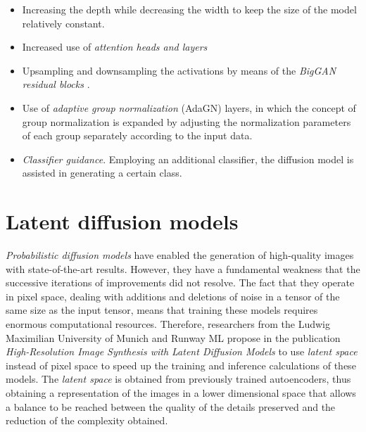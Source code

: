 \begin{itemize}
    \item Increasing the depth while decreasing the width to keep the size of the model relatively constant.
    \item Increased use of \textit{attention heads and layers}
    \item Upsampling and downsampling the activations by means of the \textit{BigGAN residual blocks} \cite{brock2018large}.
    \item Use of \textit{adaptive group normalization} (AdaGN) layers, in which the concept of group normalization is expanded by adjusting the normalization parameters of each group separately according to the input data.
    \item \textit{Classifier guidance}. Employing an additional classifier, the diffusion model is assisted in generating a certain class.
\end{itemize}

\section{Latent diffusion models} \label{Ldiffusion}

\textit{Probabilistic diffusion models} have enabled the generation of high-quality images with state-of-the-art results. However, they have a fundamental weakness that the successive iterations of improvements did not resolve. The fact that they operate in pixel space, dealing with additions and deletions of noise in a tensor of the same size as the input tensor, means that training these models requires enormous computational resources. Therefore, researchers from the Ludwig Maximilian University of Munich and Runway ML propose in the publication \textit{High-Resolution Image Synthesis with Latent Diffusion Models} \cite{rombach2022high} to use \textit{latent space} instead of pixel space to speed up the training and inference calculations of these models. The \textit{latent space} is obtained from previously trained autoencoders, thus obtaining a representation of the images in a lower dimensional space that allows a balance to be reached between the quality of the details preserved and the reduction of the complexity obtained.

